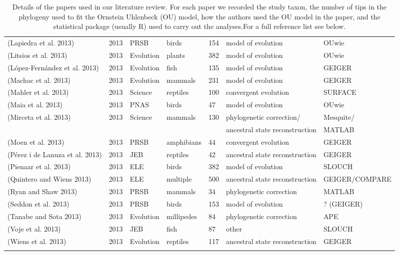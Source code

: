 \begin{longtable}{p{6cm}llllll}
(Lapiedra et al. 2013)	&	2013	&	PRSB	&	birds	&	154	&	model of evolution	&	OUwie	\\
(Litsios et al. 2013)	&	2013	&	Evolution	&	plants	&	382	&	model of evolution	&	OUwie	\\
(López-Fernández et al. 2013)	&	2013	&	Evolution	&	fish	&	135	&	model of evolution	&	GEIGER	\\
(Machac et al. 2013)	&	2013	&	Evolution	&	mammals	&	231	&	model of evolution	&	GEIGER	\\
(Mahler et al. 2013)	&	2013	&	Science	&	reptiles	&	100	&	convergent evolution	&	SURFACE	\\
(Maia et al. 2013)	&	2013	&	PNAS	&	birds	&	47	&	model of evolution	&	OUwie	\\
(Mirceta et al. 2013)	&	2013	&	Science	&	mammals	&	130	&	phylogenetic correction/	&	Mesquite/	\\
	&		&		&		&		&	ancestral state reconstruction	&	MATLAB	\\
(Moen et al. 2013)	&	2013	&	PRSB	&	amphibians	&	44	&	convergent evolution	&	GEIGER	\\
(Pérez i de Lanuza et al. 2013)	&	2013	&	JEB	&	reptiles	&	42	&	ancestral state reconstruction	&	GEIGER	\\
(Pienaar et al. 2013)	&	2013	&	ELE	&	birds	&	382	&	model of evolution	&	SLOUCH	\\
(Quintero and Wiens 2013)	&	2013	&	ELE	&	multiple	&	500	&	ancestral state reconstruction	&	GEIGER/COMPARE	\\
(Ryan and Shaw 2013)	&	2013	&	PRSB	&	mammals	&	34	&	phylogenetic correction	&	MATLAB	\\
(Seddon et al. 2013) 	&	2013	&	PRSB	&	birds	&	153	&	model of evolution	&	? (GEIGER)	\\
(Tanabe and Sota 2013)	&	2013	&	Evolution	&	millipedes	&	84	&	phylogenetic correction	&	APE	\\
(Voje et al. 2013)	&	2013	&	JEB	&	fish	&	87	&	other	&	SLOUCH	\\
(Wiens et al. 2013)	&	2013	&	Evolution	&	reptiles	&	117	&	ancestral state reconstruction	&	GEIGER	\\
\hline
\caption[Literature review]
			{Details of the papers used in our literature review. For each paper we recorded the study taxon, the number of tips in the phylogeny used to fit the Ornstein Uhlenbeck (OU) model, how the authors used the OU model in the paper, and the statistical package (usually R) used to carry out the analyses.For a full reference list see below.}
\label{tab:sk.measurements}

\end{longtable}